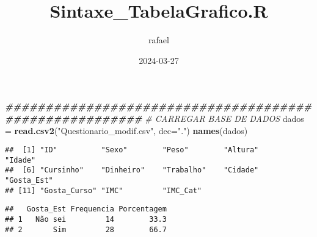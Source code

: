 \documentclass[
]{article}
\title{Sintaxe\_TabelaGrafico.R}
\author{rafael}
\date{2024-03-27}
\newenvironment{Shaded}{\begin{snugshade}}{\end{snugshade}}
\newcommand{\AttributeTok}[1]{\textcolor[rgb]{0.13,0.29,0.53}{#1}}
\newcommand{\CommentTok}[1]{\textcolor[rgb]{0.56,0.35,0.01}{\textit{#1}}}
\newcommand{\DecValTok}[1]{\textcolor[rgb]{0.00,0.00,0.81}{#1}}
\newcommand{\DocumentationTok}[1]{\textcolor[rgb]{0.56,0.35,0.01}{\textbf{\textit{#1}}}}
\newcommand{\FunctionTok}[1]{\textcolor[rgb]{0.13,0.29,0.53}{\textbf{#1}}}
\newcommand{\NormalTok}[1]{#1}
\newcommand{\OtherTok}[1]{\textcolor[rgb]{0.56,0.35,0.01}{#1}}
\newcommand{\SpecialCharTok}[1]{\textcolor[rgb]{0.81,0.36,0.00}{\textbf{#1}}}
\newcommand{\StringTok}[1]{\textcolor[rgb]{0.31,0.60,0.02}{#1}}
\begin{document}
\maketitle

\begin{Shaded}
\begin{Highlighting}[]
\DocumentationTok{\#\#\#\#\#\#\#\#\#\#\#\#\#\#\#\#\#\#\#\#\#\#\#\#\#\#\#\#\#\#\#\#\#\#\#\#\#\#\#\#\#\#\#\#\#\#\#\#\#\#\#\#\#\#\#}
\CommentTok{\# CARREGAR BASE DE DADOS}
\NormalTok{dados }\OtherTok{=} \FunctionTok{read.csv2}\NormalTok{(}\StringTok{"Questionario\_modif.csv"}\NormalTok{, }\AttributeTok{dec=}\StringTok{"."}\NormalTok{)}
\FunctionTok{names}\NormalTok{(dados)}
\end{Highlighting}
\end{Shaded}

\begin{verbatim}
##  [1] "ID"          "Sexo"        "Peso"        "Altura"      "Idade"      
##  [6] "Cursinho"    "Dinheiro"    "Trabalho"    "Cidade"      "Gosta_Est"  
## [11] "Gosta_Curso" "IMC"         "IMC_Cat"
\end{verbatim}

\begin{Shaded}
\end{Shaded}

\begin{verbatim}
##   Gosta_Est Frequencia Porcentagem
## 1   Não sei         14        33.3
## 2       Sim         28        66.7
\end{verbatim}
\end{document}

